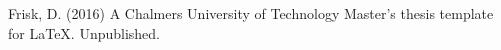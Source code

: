 \begin{thebibliography}{69}

 Frisk, D. (2016) A Chalmers University of Technology Master's thesis template for \LaTeX . Unpublished.

\end{thebibliography}
